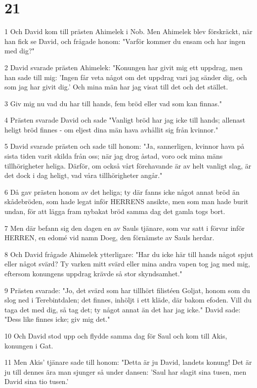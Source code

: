 \chapter{21}

\par 1 Och David kom till prästen Ahimelek i Nob. Men Ahimelek blev förskräckt, när han fick se David, och frågade honom: "Varför kommer du ensam och har ingen med dig?"
\par 2 David svarade prästen Ahimelek: "Konungen har givit mig ett uppdrag, men han sade till mig: 'Ingen får veta något om det uppdrag vari jag sänder dig, och som jag har givit dig.' Och mina män har jag visat till det och det stället.
\par 3 Giv mig nu vad du har till hands, fem bröd eller vad som kan finnas."
\par 4 Prästen svarade David och sade "Vanligt bröd har jag icke till hands; allenast heligt bröd finnes - om eljest dina män hava avhållit sig från kvinnor."
\par 5 David svarade prästen och sade till honom: "Ja, sannerligen, kvinnor hava på sista tiden varit skilda från oss; när jag drog åstad, voro ock mina mäns tillhörigheter heliga. Därför, om också vårt förehavande är av helt vanligt slag, är det dock i dag heligt, vad våra tillhörigheter angår."
\par 6 Då gav prästen honom av det heliga; ty där fanns icke något annat bröd än skådebröden, som hade legat inför HERRENS ansikte, men som man hade burit undan, för att lägga fram nybakat bröd samma dag det gamla togs bort.
\par 7 Men där befann sig den dagen en av Sauls tjänare, som var satt i förvar inför HERREN, en edomé vid namn Doeg, den förnämste av Sauls herdar.
\par 8 Och David frågade Ahimelek ytterligare: "Har du icke här till hands något spjut eller något svärd? Ty varken mitt svärd eller mina andra vapen tog jag med mig, eftersom konungens uppdrag krävde så stor skyndsamhet."
\par 9 Prästen svarade: "Jo, det svärd som har tillhört filistéen Goljat, honom som du slog ned i Terebintdalen; det finnes, inhöljt i ett kläde, där bakom efoden. Vill du taga det med dig, så tag det; ty något annat än det har jag icke." David sade: "Dess like finnes icke; giv mig det."
\par 10 Och David stod upp och flydde samma dag för Saul och kom till Akis, konungen i Gat.
\par 11 Men Akis' tjänare sade till honom: "Detta är ju David, landets konung! Det är ju till dennes ära man sjunger så under dansen: 'Saul har slagit sina tusen, men David sina tio tusen.'
